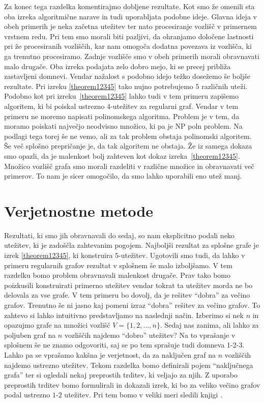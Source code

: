\documentclass[12pt,a4paper,twoside]{article}
\theoremstyle{definition} %
\theoremstyle{plain} %
\numberwithin{equation}{section}  %
\begin{document}
Za konec tega razdelka komentirajmo dobljene rezultate. Kot smo že omenili sta oba izreka algoritmične narave in tudi uporabljata podobne ideje. Glavna ideja v obeh primerih je neka začetna utežitev ter nato procesiranje vozlišč v primernem vrstnem redu. Pri tem smo morali biti pazljivi, da ohranjamo določene lastnosti pri že procesiranih vozliščih, kar nam omogoča dodatna povezava iz vozlišča, ki ga trenutno procesiramo. Zadnje vozlišče smo v obeh primerih morali obravnavati malo drugače. Oba izreka podajata zelo dobro mejo, ki se precej približa zastavljeni domnevi. Vendar nažalost s podobno idejo težko dosežemo še boljše rezultate. Pri izreku \ref{theorem12345} tako nujno potrebujemo $5$ različnih uteži. Podobno kot pri izreku~\ref{theorem12345} lahko tudi v tem primeru zapišemo algoritem, ki bi poiskal ustrezno $4$-utežitev za regularni graf. Vendar v tem primeru ne moremo napisati polinomskega algoritma. Problem je v tem, da moramo poiskati največjo neodvisno množico, ki pa je NP poln problem. Na podlagi tega torej še ne vemo, ali za tak problem obstaja polinomski algoritem. Še več splošno prepričanje je, da tak algoritem ne obstaja. Že iz samega dokaza smo opazli, da je malenkost bolj zahteven kot dokaz izreka~\ref{theorem12345}. Množico vozlišč grafa smo morali razdeliti v različne množice in obravnavati več primerov. To nam je sicer omogočilo, da smo lahko uporabili eno utež manj.	
 
 \section{Verjetnostne metode}

Rezultati, ki smo jih obravnavali do sedaj, so nam eksplicitno podali neko utežitev, ki je zadoščla zahtevanim pogojem. Najboljši rezultat za splošne grafe je izrek \ref{theorem12345}, ki konstruira $5$-utežitev. Ugotovili smo tudi, da lahko v primeru regularnih grafov rezultat v splošnem še malo izboljšamo. V tem razdelku bomo problem obravnavali malenkost drugače. Prav tako bomo poizkusili konstruirati primerno utežitev vendar tokrat ta utežitev morda ne bo delovala za vse grafe. V tem primeru bo dovolj, da je rešitev ``dobra'' za večino grafov. Trenutno še ni jasno kaj pomeni izraz ``dobra'' rešitev za večino grafov. To zahtevo si lahko intuitivno predstavljamo na naslednji način. Izberimo si nek $n$ in opazujmo grafe na množici vozlišč $V = \{1,2, \ldots, n\}$. Sedaj nas zanima, ali lahko za poljuben graf na $n$ vozliščih najdemo ``dobro'' utežitev? Na to vprašanje v splošnem še ne znamo odgovoriti, saj se po tem sprašuje tudi domneva 1-2-3. Lahko pa se vprašamo kakšna je verjetnost, da za naključen graf na $n$ vozliščih najdemo ustrezno utežitev. Tekom razdelka bomo definirali pojem ``naključnega grafa'' ter si ogledali nekaj preprostih trditev, ki veljajo za njih. Z uporabo preprostih trditev bomo formulirali in dokazali izrek, ki bo za veliko večino grafov podal ustrezno $1$-$2$ utežitev. Pri tem bomo v veliki meri sledili knjigi \citet{maingraph}.
\end{document}
